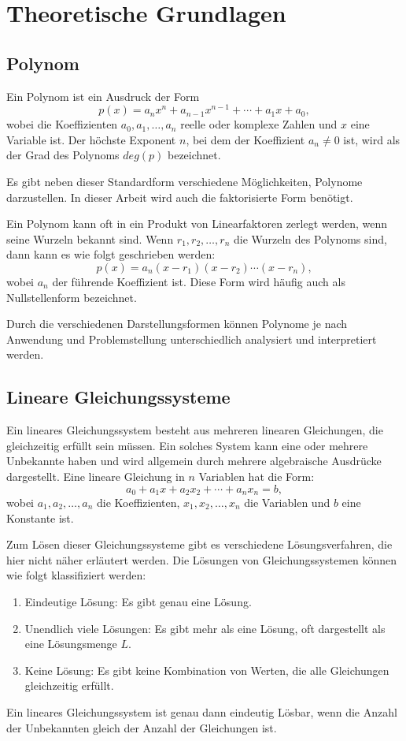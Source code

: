 \chapter{Theoretische Grundlagen}\label{ch:foundation}

\section{Polynom}\label{sec:polynom}

Ein Polynom ist ein Ausdruck der Form
\[
p(x) = a_n x^n + a_{n-1} x^{n-1} + \cdots + a_1 x + a_0,
\]
wobei die Koeffizienten \( a_0, a_1, \ldots, a_n \) reelle oder komplexe Zahlen und \( x \) eine Variable ist. 
Der höchste Exponent \( n \), bei dem der Koeffizient \( a_n \neq 0 \) ist, wird als der Grad des Polynoms $deg(p)$ bezeichnet.

Es gibt neben dieser Standardform verschiedene Möglichkeiten, Polynome darzustellen. 
In dieser Arbeit wird auch die faktorisierte Form benötigt.

Ein Polynom kann oft in ein Produkt von Linearfaktoren zerlegt werden, wenn seine Wurzeln bekannt sind. Wenn \( r_1, r_2, \ldots, r_n \) die Wurzeln des Polynoms sind, dann kann es wie folgt geschrieben werden:
\[
p(x) = a_n (x - r_1)(x - r_2) \cdots (x - r_n),
\]
wobei \( a_n \) der führende Koeffizient ist.
Diese Form wird häufig auch als Nullstellenform bezeichnet.


Durch die verschiedenen Darstellungsformen können Polynome je nach Anwendung und Problemstellung unterschiedlich analysiert und interpretiert werden.

\section{Lineare Gleichungssysteme}\label{sec:equationSystem}

Ein lineares Gleichungssystem besteht aus mehreren linearen Gleichungen, die gleichzeitig erfüllt sein müssen. 
Ein solches System kann eine oder mehrere Unbekannte haben und wird allgemein durch mehrere algebraische Ausdrücke dargestellt. 
Eine lineare Gleichung in \( n \) Variablen hat die Form:
\[
a_0 + a_1 x + a_2 x_2 + \cdots + a_n x_n = b,
\]
wobei \( a_1, a_2, \ldots, a_n \) die Koeffizienten, \( x_1, x_2, \ldots, x_n \) die Variablen und \( b \) eine Konstante ist. 

Zum Lösen dieser Gleichungssysteme gibt es verschiedene Lösungsverfahren, die hier nicht näher erläutert werden.
Die Lösungen von Gleichungssystemen können wie folgt klassifiziert werden:
\begin{enumerate}[noitemsep]
	\item Eindeutige Lösung: Es gibt genau eine Lösung.
	\item Unendlich viele Lösungen: Es gibt mehr als eine Lösung, oft dargestellt als eine Lösungsmenge $L$.
	\item Keine Lösung: Es gibt keine Kombination von Werten, die alle Gleichungen gleichzeitig erfüllt.
\end{enumerate}
Ein lineares Gleichungssystem ist genau dann eindeutig Lösbar, wenn die Anzahl der Unbekannten gleich der Anzahl der Gleichungen ist.

